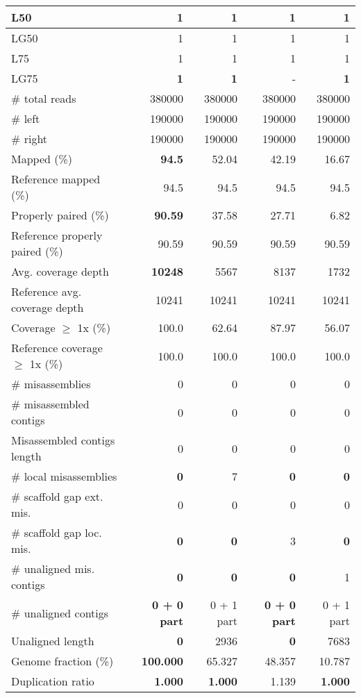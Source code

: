 \documentclass[12pt,a4paper]{article}
\begin{document}
\begin{table}[ht]
\begin{center}
\begin{tabular}{|l*{4}{|r}|}
L50 & 1 & 1 & 1 & 1 \\ \hline
LG50 & 1 & 1 & 1 & 1 \\ \hline
L75 & 1 & 1 & 1 & 1 \\ \hline
LG75 & {\bf 1} & {\bf 1} & - & {\bf 1} \\ \hline
\# total reads & 380000 & 380000 & 380000 & 380000 \\ \hline
\# left & 190000 & 190000 & 190000 & 190000 \\ \hline
\# right & 190000 & 190000 & 190000 & 190000 \\ \hline
Mapped (\%) & {\bf 94.5} & 52.04 & 42.19 & 16.67 \\ \hline
Reference mapped (\%) & 94.5 & 94.5 & 94.5 & 94.5 \\ \hline
Properly paired (\%) & {\bf 90.59} & 37.58 & 27.71 & 6.82 \\ \hline
Reference properly paired (\%) & 90.59 & 90.59 & 90.59 & 90.59 \\ \hline
Avg. coverage depth & {\bf 10248} & 5567 & 8137 & 1732 \\ \hline
Reference avg. coverage depth & 10241 & 10241 & 10241 & 10241 \\ \hline
Coverage $\geq$ 1x (\%) & 100.0 & 62.64 & 87.97 & 56.07 \\ \hline
Reference coverage $\geq$ 1x (\%) & 100.0 & 100.0 & 100.0 & 100.0 \\ \hline
\# misassemblies & 0 & 0 & 0 & 0 \\ \hline
\# misassembled contigs & 0 & 0 & 0 & 0 \\ \hline
Misassembled contigs length & 0 & 0 & 0 & 0 \\ \hline
\# local misassemblies & {\bf 0} & 7 & {\bf 0} & {\bf 0} \\ \hline
\# scaffold gap ext. mis. & 0 & 0 & 0 & 0 \\ \hline
\# scaffold gap loc. mis. & {\bf 0} & {\bf 0} & 3 & {\bf 0} \\ \hline
\# unaligned mis. contigs & {\bf 0} & {\bf 0} & {\bf 0} & 1 \\ \hline
\# unaligned contigs & {\bf 0 + 0 part} & 0 + 1 part & {\bf 0 + 0 part} & 0 + 1 part \\ \hline
Unaligned length & {\bf 0} & 2936 & {\bf 0} & 7683 \\ \hline
Genome fraction (\%) & {\bf 100.000} & 65.327 & 48.357 & 10.787 \\ \hline
Duplication ratio & {\bf 1.000} & {\bf 1.000} & 1.139 & {\bf 1.000} \\ \hline

\end{tabular}
\end{center}
\end{table}
\end{document}

